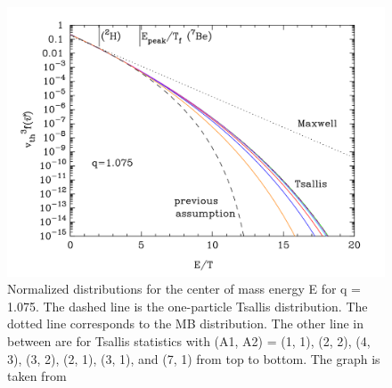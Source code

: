 \documentclass[11pt]{article}
\numberwithin{equation}{section}
\begin{document}
\begin{figure}[H]
  \includegraphics[width=\linewidth]{"./Figures/relative_distribution"}
  \caption{Normalized distributions for the center of mass energy E for q = 1.075. The dashed line is the one-particle Tsallis distribution. The dotted line corresponds to the MB distribution. The other line in between are for Tsallis statistics with (A1, A2) = (1, 1), (2, 2), (4, 3), (3, 2), (2, 1), (3, 1), and (7, 1) from top to bottom.  The graph is taken from \citep{Kusakabe:2018dzx}}
  \label{fig:relative_distribution}
\end{figure}
\end{document}
